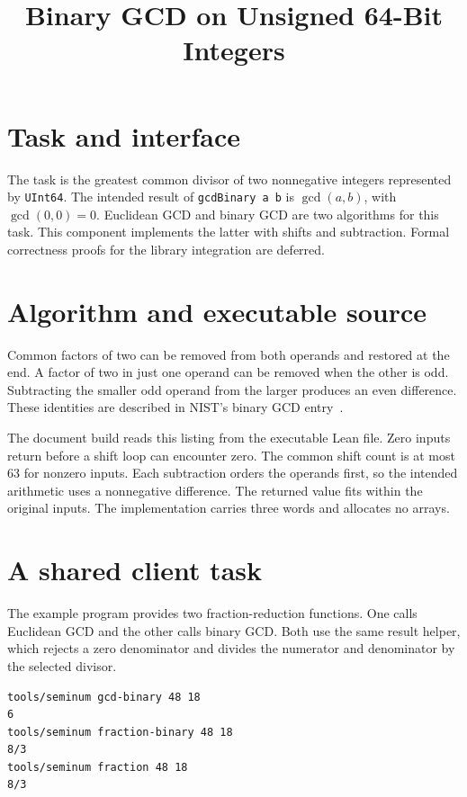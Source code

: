 
\title{Binary GCD on Unsigned 64-Bit Integers}

\maketitle

\section{Task and interface}
The task is the greatest common divisor of two nonnegative integers represented
by \texttt{UInt64}.  The intended result of \texttt{gcdBinary a b} is
$\gcd(a,b)$, with $\gcd(0,0)=0$.  Euclidean GCD and binary GCD are two algorithms
for this task.  This component implements the latter with shifts and subtraction.
Formal correctness proofs for the library integration are deferred.

\section{Algorithm and executable source}
Common factors of two can be removed from both operands and restored at the
end.  A factor of two in just one operand can be removed when the other is odd.
Subtracting the smaller odd operand from the larger produces an even difference.
These identities are described in NIST's binary GCD entry~\cite{binary}.



The document build reads this listing from the executable Lean file.  Zero
inputs return before a shift loop can encounter zero.  The common shift count
is at most 63 for nonzero inputs.  Each subtraction orders the operands first,
so the intended arithmetic uses a nonnegative difference.  The returned value
fits within the original inputs.  The implementation carries three words and
allocates no arrays.

\section{A shared client task}
The example program provides two fraction-reduction functions.  One calls
Euclidean GCD and the other calls binary GCD.  Both use the same result helper,
which rejects a zero denominator and divides the numerator and denominator
by the selected divisor.

\begin{lstlisting}
tools/seminum gcd-binary 48 18
6
tools/seminum fraction-binary 48 18
8/3
tools/seminum fraction 48 18
8/3
\end{lstlisting}

